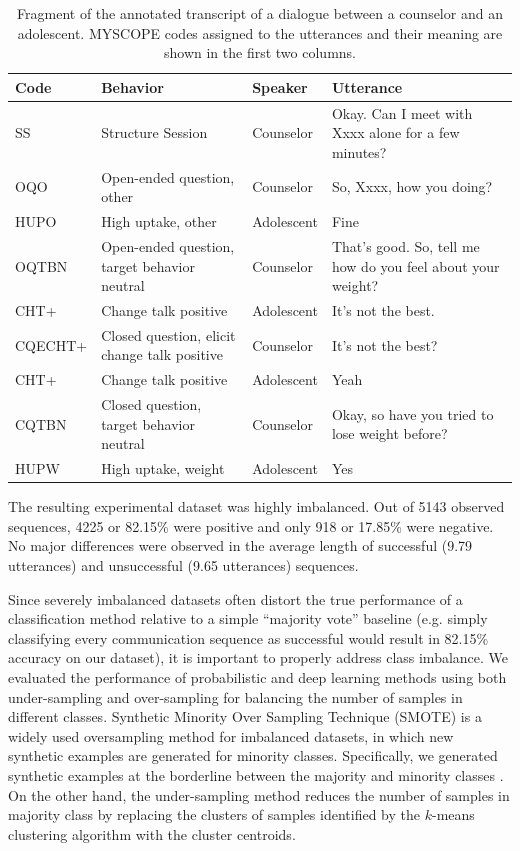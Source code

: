 \documentclass{amia_summit_2018}
\begin{document}
\begin{table}[h]
\caption{Fragment of the annotated transcript of a dialogue between a counselor and an adolescent. MYSCOPE codes assigned to the utterances and their meaning are shown in the first two columns.}    
\label{tab:anno_examp}
\centering
\begin{tabular}{|l|p{3.2cm}|l|p{8cm}|}
\hline
\bf{Code}  & \bf{Behavior} & \bf{Speaker} & \bf{Utterance} \\\hline
SS & Structure Session & Counselor & Okay. Can I meet with Xxxx alone for a few minutes? \\\hline
OQO & Open-ended question, other & Counselor & So, Xxxx, how you doing? \\\hline
HUPO &    High uptake, other    & Adolescent &    Fine \\\hline
OQTBN &    Open-ended question, target behavior neutral & Counselor &    That's good.  So, tell me  how do you feel about your weight? \\\hline
CHT+ &    Change talk positive    & Adolescent &    It's not the best. \\\hline
CQECHT+ & Closed question, elicit change talk positive & Counselor & It's not the best? \\\hline
CHT+ &    Change talk positive &    Adolescent & Yeah \\\hline
CQTBN &    Closed question, target behavior neutral  & Counselor &    Okay, so have you tried to lose weight before? \\\hline
HUPW &    High uptake, weight & Adolescent &    Yes \\\hline
\end{tabular}
\end{table}

The resulting experimental dataset was highly imbalanced. Out of 5143 observed sequences, 4225 or 82.15\% were positive and only 918 or 17.85\% were negative. No major differences were observed in the average length of successful (9.79 utterances) and unsuccessful (9.65 utterances) sequences.  

Since severely imbalanced datasets often distort the true performance of a classification method relative to a simple ``majority vote'' baseline (e.g. simply classifying every communication sequence as successful would result in 82.15\% accuracy on our dataset), it is important to properly address class imbalance. We evaluated the performance of probabilistic and deep learning methods using both under-sampling and over-sampling for balancing the number of samples in different classes. Synthetic Minority Over Sampling Technique (SMOTE) \cite{chawla2002smote} is a widely used oversampling method for imbalanced datasets, in which new synthetic examples are generated for minority classes. Specifically, we generated synthetic examples at the borderline between the majority and minority classes \cite{nguyen2011borderline}. On the other hand, the under-sampling method reduces the number of samples in majority class by replacing the clusters of samples identified by the $k$-means clustering algorithm with the cluster centroids.
\end{document}
